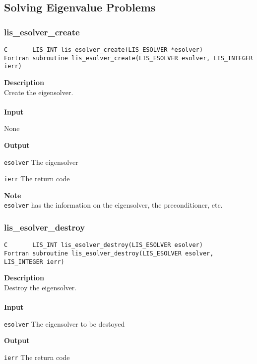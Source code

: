 \documentclass[a4paper]{article}
\newcommand{\namelistlabel}[1]{\mbox{#1}\hfill}
\newenvironment{namelist}[1]{%
\begin{list}{}
  {\let\makelabel\namelistlabel
  \settowidth{\labelwidth}{#1}
  \setlength{\leftmargin}{1.1\labelwidth}}
  }{%
\end{list}}
\begin{document}
\newpage
\subsection{Solving Eigenvalue Problems}
\subsubsection{lis\_esolver\_create}
\begin{screen}
\verb|C       LIS_INT lis_esolver_create(LIS_ESOLVER *esolver)|\\
\verb|Fortran subroutine lis_esolver_create(LIS_ESOLVER esolver, LIS_INTEGER ierr)|
\end{screen}
{\bf Description}\\
\indent
Create the eigensolver.
\\ \\
\noindent
{\bf Input}
\begin{namelist}{XXXXXXXXXXXXXXXXXXXX}
\item[None]
\end{namelist}
{\bf Output}
\begin{namelist}{XXXXXXXXXXXXXXXXXXXX}
\item[\tt esolver] The eigensolver
\item[\tt ierr] The return code
\end{namelist}
{\bf Note}\\
\indent
\verb|esolver| has the information on the eigensolver, the preconditioner, etc.

\subsubsection{lis\_esolver\_destroy}
\begin{screen}
\verb|C       LIS_INT lis_esolver_destroy(LIS_ESOLVER esolver)|\\
\verb|Fortran subroutine lis_esolver_destroy(LIS_ESOLVER esolver, LIS_INTEGER ierr)|
\end{screen}
{\bf Description}\\
\indent
Destroy the eigensolver.
\\ \\
\noindent
{\bf Input}
\begin{namelist}{XXXXXXXXXXXXXXXXXXXX}
\item[\tt esolver] The eigensolver to be destoyed
\end{namelist}
{\bf Output}
\begin{namelist}{XXXXXXXXXXXXXXXXXXXX}
\item[\tt ierr] The return code
\end{namelist}
\end{document}
